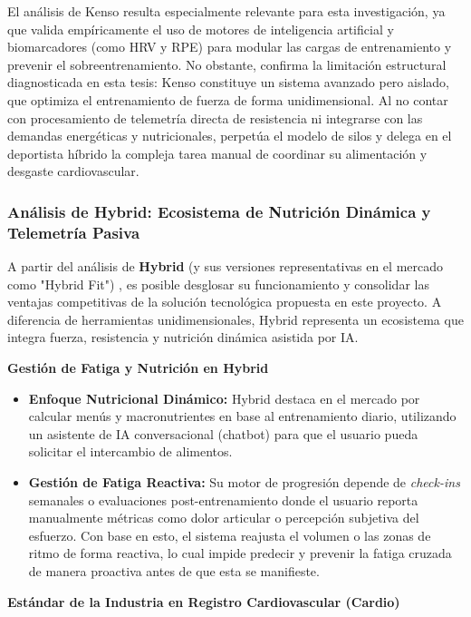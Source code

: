 \documentclass[12pt]{article}
\begin{document}
El análisis de Kenso resulta especialmente relevante para esta investigación, ya que valida empíricamente el uso de motores de inteligencia artificial y biomarcadores (como HRV y RPE) para modular las cargas de entrenamiento y prevenir el sobreentrenamiento. No obstante, confirma la limitación estructural diagnosticada en esta tesis: Kenso constituye un sistema avanzado pero aislado, que optimiza el entrenamiento de fuerza de forma unidimensional. Al no contar con procesamiento de telemetría directa de resistencia ni integrarse con las demandas energéticas y nutricionales, perpetúa el modelo de silos y delega en el deportista híbrido la compleja tarea manual de coordinar su alimentación y desgaste cardiovascular.

\newpage
\subsubsection{Análisis de Hybrid: Ecosistema de Nutrición Dinámica y Telemetría Pasiva}
A partir del análisis de \textbf{Hybrid} (y sus versiones representativas en el mercado como "Hybrid Fit") \citep{hybrid_apple, hybrid_google}, es posible desglosar su funcionamiento y consolidar las ventajas competitivas de la solución tecnológica propuesta en este proyecto. A diferencia de herramientas unidimensionales, Hybrid representa un ecosistema que integra fuerza, resistencia y nutrición dinámica asistida por IA.

\textbf{Gestión de Fatiga y Nutrición en Hybrid}

\begin{itemize}
    \item \textbf{Enfoque Nutricional Dinámico:} Hybrid destaca en el mercado por calcular menús y macronutrientes en base al entrenamiento diario, utilizando un asistente de IA conversacional (chatbot) para que el usuario pueda solicitar el intercambio de alimentos.
    \item \textbf{Gestión de Fatiga Reactiva:} Su motor de progresión depende de \textit{check-ins} semanales o evaluaciones post-entrenamiento donde el usuario reporta manualmente métricas como dolor articular o percepción subjetiva del esfuerzo. Con base en esto, el sistema reajusta el volumen o las zonas de ritmo de forma reactiva, lo cual impide predecir y prevenir la fatiga cruzada de manera proactiva antes de que esta se manifieste.
\end{itemize}
\newpage
\textbf{Estándar de la Industria en Registro Cardiovascular (Cardio)}
\end{document}
